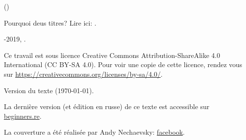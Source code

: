 ﻿\begin{titlepage}


\end{titlepage}

\newpage

\begin{center}
\vspace*{\fill}
{\LARGE \TitleMain}

\bigskip

{\large (\TitleAux)}

\bigskip
\bigskip
Pourquoi deus titres? Lire ici: .

\vspace*{\fill}

{\large \AUTHOR}

{\large \TT{<\EMAIL>}}
\vspace*{\fill}
\vfill

\ccbysa

-2019, \AUTHOR. 

Ce travail est sous licence Creative Commons Attribution-ShareAlike 4.0 International (CC BY-SA 4.0).
Pour voir une copie de cette licence, rendez vous sur \url{https://creativecommons.org/licenses/by-sa/4.0/}.

Version du texte ({\large \today}).

La dernière version (et édition en russe) de ce texte est accessible sur \href{http://go.yurichev.com/17009}{beginners.re}.

La couverture a été réalisée par Andy Nechaevsky: \href{http://go.yurichev.com/17023}{facebook}.

\end{center}
